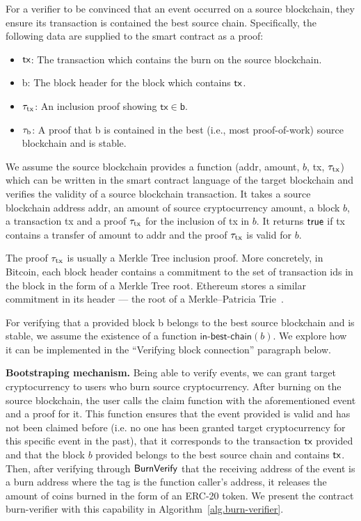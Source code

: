 For a verifier to be convinced that an event occurred on a source blockchain, they ensure its transaction is contained the best source chain. Specifically, the following data are supplied to the smart contract as a proof:

\begin{itemize}
  \item $\textsf{tx}$: The transaction which contains the burn on the source blockchain.
  \item \textsf{b}: The block header for the block which contains $\textsf{tx}$.
  \item $\tau_\text{tx}$: An inclusion proof showing $\mathsf{tx} \in \mathsf{b}$.
  \item $\tau_\text{b}$: A proof that \textsf{b} is contained in the best (i.e., most proof-of-work) source blockchain and is stable.
\end{itemize}

We assume the source blockchain provides a function \verifytx(\textsf{addr}, \textsf{amount}, $b$, \textsf{tx}, $\tau_\text{tx}$) which can be written in the smart contract language of the target blockchain and verifies the validity of a source blockchain transaction. It takes a source blockchain address \textsf{addr}, an amount of source cryptocurrency \textsf{amount}, a block $b$, a transaction \textsf{tx} and a proof $\tau_\text{tx}$ for the inclusion of \textsf{tx} in $b$. It returns $\mathsf{true}$ if \textsf{tx} contains a transfer of \textsf{amount} to \textsf{addr} and the proof $\tau_\text{tx}$ is valid for $b$.

The proof $\tau_\text{tx}$ is usually a Merkle Tree inclusion proof. More concretely, in Bitcoin, each block header contains a commitment to the set of transaction ids in the block in the form of a Merkle Tree root. Ethereum stores a similar commitment in its header --- the root of a Merkle--Patricia Trie~\cite{wood2014ethereum}.

For verifying that a provided block \textsf{b} belongs to the best source blockchain and is stable, we assume the existence of a function $\textsf{in-best-chain}(b)$. We explore how it can be implemented in the ``Verifying block connection'' paragraph below.

\noindent
\textbf{Bootstraping mechanism.}
Being able to verify events, we can grant target cryptocurrency to users who burn source cryptocurrency. After burning on the source blockchain, the user calls the \textsf{claim} function with the aforementioned event and a proof for it. This function ensures that the event provided is valid and has not been claimed before (i.e. no one has been granted target cryptocurrency for this specific event in the past), that it corresponds to the transaction $\textsf{tx}$ provided and that the block $b$ provided belongs to the best source chain and contains $\textsf{tx}$. Then, after verifying through $\mathsf{BurnVerify}$ that the receiving address of the event is a burn address where the tag is the function caller's address, it releases the amount of coins burned in the form of an ERC-20 token. We present the contract \textsf{burn-verifier} with this capability in Algorithm~\ref{alg.burn-verifier}.

